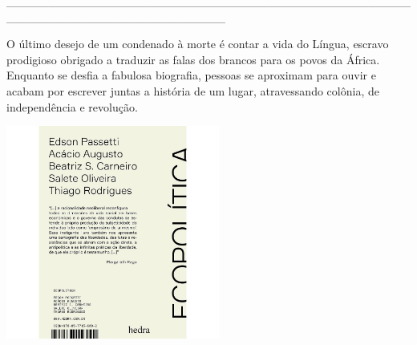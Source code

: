 \hspace*{-2cm}\_\_\_\_\_\_\_\_\_\_\_\_\_\_\_\_\_\_\_\_\_\_\_\_\_\_\_\_\_\_\_\_\_\_\_\_\_\_\_\_\_\_\_\_\_\_\_\_\_\_\_\_\_\_\_\_\_\_\_\_\_\_\_\_\_\_\_\_\_\_\_\_\_\_

\medskip

\noindent{}O último desejo de um condenado à morte é contar a vida do Língua, escravo prodigioso obrigado a traduzir as falas dos brancos para os povos da África. Enquanto se desfia a fabulosa biografia, pessoas se aproximam para ouvir e acabam por escrever juntas a história de um lugar, atravessando colônia, de independência e revolução.

\hspace{.5cm}

\hspace*{-.4cm}\begin{minipage}[c]{0.90\linewidth}
\small{
{}}
\end{minipage}

\pagebreak

\hspace{.5cm}

\begin{center}
\hspace*{-1cm}
\hspace{1cm}\includegraphics[width=70mm]{eco.jpeg}
\end{center}

